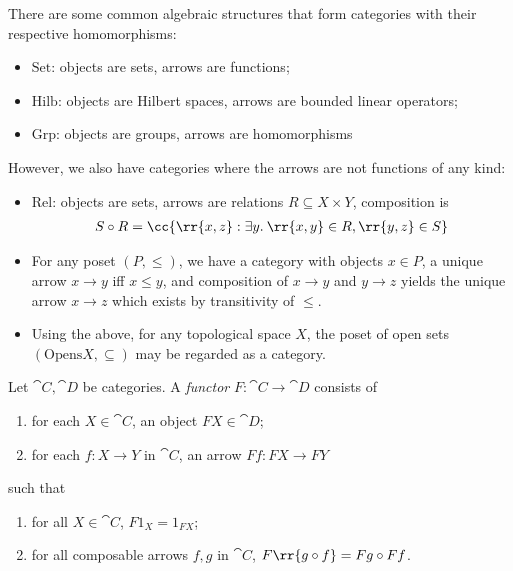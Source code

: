\documentclass{article}
\begin{document}
\begin{example}
  There are some common algebraic structures that form categories with their respective
  homomorphisms:
  \begin{itemize}
    \item $\text{Set}$: objects are sets, arrows are functions;
    \item $\text{Hilb}$: objects are Hilbert spaces, arrows are bounded linear operators;
    \item $\text{Grp}$: objects are groups, arrows are homomorphisms
  \end{itemize}
\end{example}

\begin{example}
  However, we also have categories where the arrows are not functions of any kind:
  \begin{itemize}
    \item $\text{Rel}$: objects are sets, arrows are relations $R\subseteq X\times Y$,
      composition is
      \begin{align*}
        S\circ R=\cc{\rr{x,z} : \exists y.\:\rr{x,y}\in R,\rr{y,z}\in S}
      \end{align*}
    \item For any poset $(P,\leq)$, we have a category with objects $x\in P$,
      a unique arrow $x\to y$ iff $x\leq y$, and composition of $x\to y$ and
      $y\to z$ yields the unique arrow $x\to z$ which exists by transitivity
      of $\leq$.
    \item Using the above, for any topological space $X$, the poset of open sets
      $(\text{Opens}X, \subseteq)$ may be regarded as a category.
  \end{itemize}
\end{example}

\begin{definition}\label{def:functor}
  Let $\cat{C},\cat{D}$ be categories. A \emph{functor} $F:\cat{C}\to\cat{D}$
  consists of
  \begin{enumerate}
    \item for each $X\in\cat{C}$, an object $FX\in\cat{D}$;
    \item for each $f:X\to Y$ in $\cat{C}$, an arrow $Ff:FX\to FY$
  \end{enumerate}
  such that
  \begin{enumerate}
    \item for all $X\in\cat{C}$, $F1_X=1_{FX}$;
    \item for all composable arrows $f,g$ in $\cat{C}$, $F\rr{g\circ f}=Fg\circ Ff$.
  \end{enumerate}
\end{definition}
\end{document}
